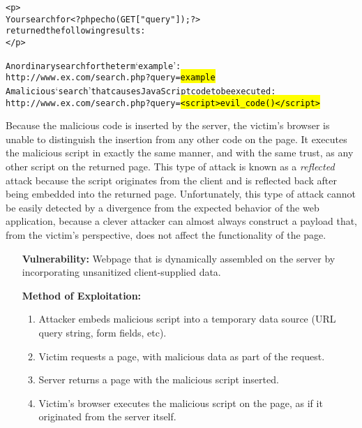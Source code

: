 \documentclass{acmtrans2m}
\begin{document}
\begin{alltt}
<p>
Your search for <?php echo(GET["query"]); ?>
returned the following results:
</p>

\textnormal{An ordinary search for the term `example':}
http://www.ex.com/search.php?query=\hl{example}
\textnormal{A malicious `search' that causes JavaScript code to be executed:}
http://www.ex.com/search.php?query=\hl{<script>evil_code()</script>}
\end{alltt}

Because the malicious code is inserted by the server, the victim's browser is unable to distinguish the insertion from any other code on the page.
It executes the malicious script in exactly the same manner, and with the same trust, as any other script on the returned page.
This type of attack is known as a \emph{reflected} attack because the script originates from the client and is reflected back after being embedded into the returned page.
Unfortunately, this type of attack cannot be easily detected by a divergence from the expected behavior of the web application, because a clever attacker can almost always construct a payload that, from the victim's perspective, does not affect the functionality of the page.

\begin{itemize}
 \item[\textbf{Vulnerability:}] Webpage that is dynamically assembled on the server by incorporating unsanitized client-supplied data.
 \item[\textbf{Method of Exploitation:}]~
  \begin{enumerate}
   \item Attacker embeds malicious script into a temporary data source (URL query string, form fields, etc).
   \item Victim requests a page, with malicious data as part of the request.
   \item Server returns a page with the malicious script inserted.
   \item Victim's browser executes the malicious script on the page, as if it originated from the server itself.
  \end{enumerate}
\end{itemize}

\end{document}
